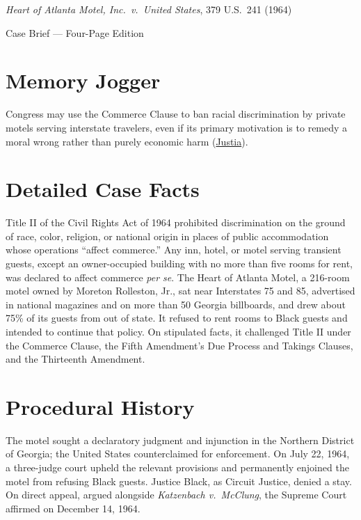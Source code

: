 \documentclass[12pt]{article}
\begin{document}
\begin{center}
{\LARGE \textit{Heart of Atlanta Motel, Inc.\ v.\ United States}, 379 U.S.\ 241 (1964)\par}
\vspace{0.8em}
{\large Case Brief --- Four-Page Edition\par}
\end{center}
\vspace{1em}

\section{Memory Jogger}

Congress may use the Commerce Clause to ban racial discrimination by private motels serving interstate travelers, even if its primary motivation is to remedy a moral wrong rather than purely economic harm (\href{https://supreme.justia.com/cases/federal/us/379/241/}{Justia}).

\section{Detailed Case Facts}

Title II of the Civil Rights Act of 1964 prohibited discrimination on the ground of race, color, religion, or national origin in places of public accommodation whose operations ``affect commerce.'' Any inn, hotel, or motel serving transient guests, except an owner-occupied building with no more than five rooms for rent, was declared to affect commerce \textit{per se}. The Heart of Atlanta Motel, a 216-room motel owned by Moreton Rolleston, Jr., sat near Interstates 75 and 85, advertised in national magazines and on more than 50 Georgia billboards, and drew about 75\% of its guests from out of state. It refused to rent rooms to Black guests and intended to continue that policy. On stipulated facts, it challenged Title II under the Commerce Clause, the Fifth Amendment's Due Process and Takings Clauses, and the Thirteenth Amendment.

\section{Procedural History}

The motel sought a declaratory judgment and injunction in the Northern District of Georgia; the United States counterclaimed for enforcement. On July 22, 1964, a three-judge court upheld the relevant provisions and permanently enjoined the motel from refusing Black guests. Justice Black, as Circuit Justice, denied a stay. On direct appeal, argued alongside \textit{Katzenbach v.\ McClung}, the Supreme Court affirmed on December 14, 1964.
\end{document}
